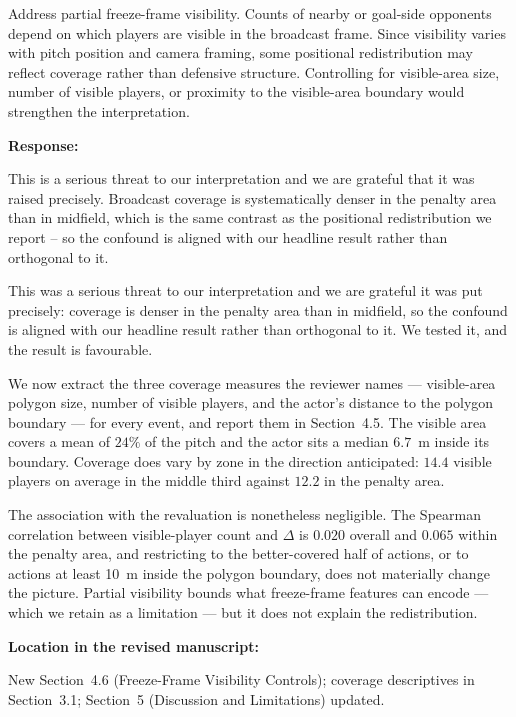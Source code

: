 \documentclass[11pt,a4paper]{article}
\newcommand{\response}[2]{%
  \begin{responsebox}
  \textbf{Response:}

  #1
  \end{responsebox}
  \begin{locationbox}
  \textbf{Location in the revised manuscript:}

  #2
  \end{locationbox}
}
\begin{document}
\begin{reviewbox}[Comment 6]
Address partial freeze-frame visibility. Counts of nearby or goal-side opponents depend on which players are visible in the broadcast frame. Since visibility varies with pitch position and camera framing, some positional redistribution may reflect coverage rather than defensive structure. Controlling for visible-area size, number of visible players, or proximity to the visible-area boundary would strengthen the interpretation.
\end{reviewbox}
\response{This is a serious threat to our interpretation and we are grateful that it was raised precisely. Broadcast coverage is systematically denser in the penalty area than in midfield, which is the same contrast as the positional redistribution we report -- so the confound is aligned with our headline result rather than orthogonal to it.

This was a serious threat to our interpretation and we are grateful it was put precisely: coverage is denser in the penalty area than in midfield, so the confound is aligned with our headline result rather than orthogonal to it. We tested it, and the result is favourable.

We now extract the three coverage measures the reviewer names --- visible-area polygon size, number of visible players, and the actor's distance to the polygon boundary --- for every event, and report them in Section~4.5. The visible area covers a mean of $24\%$ of the pitch and the actor sits a median $6.7$~m inside its boundary. Coverage does vary by zone in the direction anticipated: $14.4$ visible players on average in the middle third against $12.2$ in the penalty area.

The association with the revaluation is nonetheless negligible. The Spearman correlation between visible-player count and $\Delta$ is $0.020$ overall and $0.065$ within the penalty area, and restricting to the better-covered half of actions, or to actions at least 10~m inside the polygon boundary, does not materially change the picture. Partial visibility bounds what freeze-frame features can encode --- which we retain as a limitation --- but it does not explain the redistribution.}{New Section~4.6 (Freeze-Frame Visibility Controls); coverage descriptives in Section~3.1; Section~5 (Discussion and Limitations) updated.}
\end{document}
